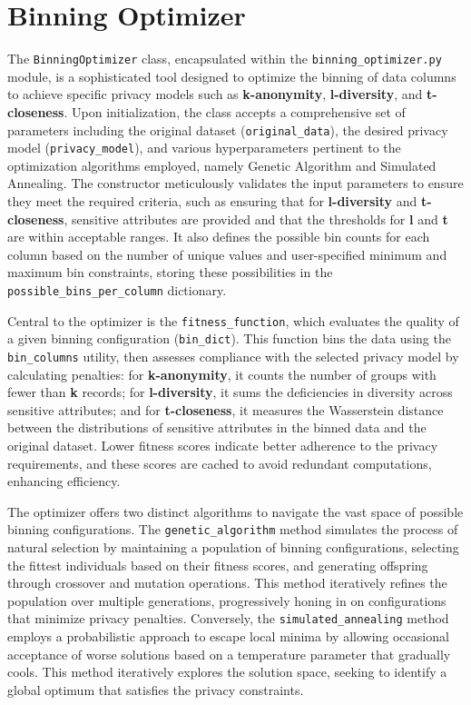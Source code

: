 \documentclass{article}
\begin{document}
\section*{Binning Optimizer}
The \texttt{BinningOptimizer} class, encapsulated within the \texttt{binning\_optimizer.py} module, is a sophisticated tool designed to optimize the binning of data columns to achieve specific privacy models such as \textbf{k-anonymity}, \textbf{l-diversity}, and \textbf{t-closeness}. Upon initialization, the class accepts a comprehensive set of parameters including the original dataset (\texttt{original\_data}), the desired privacy model (\texttt{privacy\_model}), and various hyperparameters pertinent to the optimization algorithms employed, namely Genetic Algorithm and Simulated Annealing. The constructor meticulously validates the input parameters to ensure they meet the required criteria, such as ensuring that for \textbf{l-diversity} and \textbf{t-closeness}, sensitive attributes are provided and that the thresholds for \textbf{l} and \textbf{t} are within acceptable ranges. It also defines the possible bin counts for each column based on the number of unique values and user-specified minimum and maximum bin constraints, storing these possibilities in the \texttt{possible\_bins\_per\_column} dictionary.

Central to the optimizer is the \texttt{fitness\_function}, which evaluates the quality of a given binning configuration (\texttt{bin\_dict}). This function bins the data using the \texttt{bin\_columns} utility, then assesses compliance with the selected privacy model by calculating penalties: for \textbf{k-anonymity}, it counts the number of groups with fewer than \textbf{k} records; for \textbf{l-diversity}, it sums the deficiencies in diversity across sensitive attributes; and for \textbf{t-closeness}, it measures the Wasserstein distance between the distributions of sensitive attributes in the binned data and the original dataset. Lower fitness scores indicate better adherence to the privacy requirements, and these scores are cached to avoid redundant computations, enhancing efficiency.

The optimizer offers two distinct algorithms to navigate the vast space of possible binning configurations. The \texttt{genetic\_algorithm} method simulates the process of natural selection by maintaining a population of binning configurations, selecting the fittest individuals based on their fitness scores, and generating offspring through crossover and mutation operations. This method iteratively refines the population over multiple generations, progressively honing in on configurations that minimize privacy penalties. Conversely, the \texttt{simulated\_annealing} method employs a probabilistic approach to escape local minima by allowing occasional acceptance of worse solutions based on a temperature parameter that gradually cools. This method iteratively explores the solution space, seeking to identify a global optimum that satisfies the privacy constraints.
\end{document}
